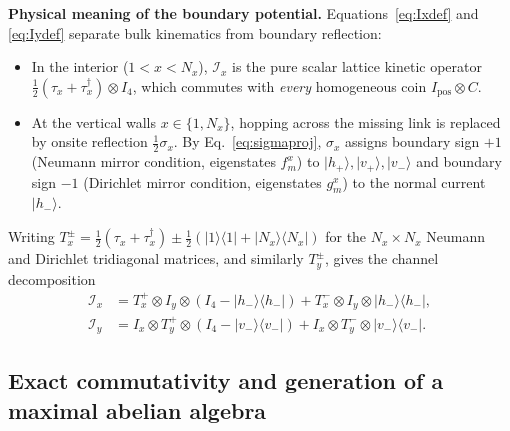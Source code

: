 \documentclass[11pt,a4paper,oneside]{report}
\newcommand{\ket}[1]{\lvert #1\rangle}
\newcommand{\bra}[1]{\langle #1\rvert}
\newcommand{\Id}{I}
\numberwithin{equation}{chapter}
\begin{document}
\textbf{Physical meaning of the boundary potential.} Equations~\eqref{eq:Ixdef}
and \eqref{eq:Iydef} separate bulk kinematics from boundary reflection:
\begin{itemize}
\item In the interior (\(1<x<N_x\)), \(\mathcal I_x\) is the pure scalar
lattice kinetic operator \(\tfrac12(\tau_x+\tau_x^\dagger)\otimes\Id_4\),
which commutes with \emph{every} homogeneous coin \(\Id_{\mathrm{pos}}\otimes C\).
\item At the vertical walls \(x\in\{1,N_x\}\), hopping across the missing
link is replaced by onsite reflection \(\tfrac12\sigma_x\). By
Eq.~\eqref{eq:sigmaproj}, \(\sigma_x\) assigns boundary sign \(+1\)
(Neumann mirror condition, eigenstates \(f_m^x\)) to \(\ket{h_+},\ket{v_+},\ket{v_-}\)
and boundary sign \(-1\) (Dirichlet mirror condition, eigenstates \(g_m^x\))
to the normal current \(\ket{h_-}\).
\end{itemize}
Writing \(T_x^\pm=\tfrac12(\tau_x+\tau_x^\dagger)\pm\tfrac12(\ket1\bra1+\ket{N_x}\bra{N_x})\)
for the \(N_x\times N_x\) Neumann and Dirichlet tridiagonal matrices, and
similarly \(T_y^\pm\), gives the channel decomposition
\begin{align}
\mathcal I_x&=T_x^+\otimes\Id_y\otimes(\Id_4-\ket{h_-}\bra{h_-})
+T_x^-\otimes\Id_y\otimes\ket{h_-}\bra{h_-},\\
\mathcal I_y&=\Id_x\otimes T_y^+\otimes(\Id_4-\ket{v_-}\bra{v_-})
+\Id_x\otimes T_y^-\otimes\ket{v_-}\bra{v_-}.
\end{align}

\subsection{Exact commutativity and generation of a maximal abelian algebra}
\end{document}
